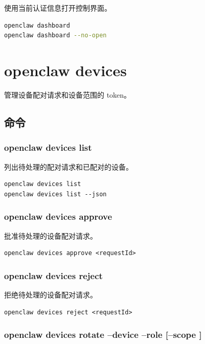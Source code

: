 使用当前认证信息打开控制界面。

\begin{lstlisting}[language=bash]
openclaw dashboard
openclaw dashboard --no-open
\end{lstlisting}



\clearpage

\section{openclaw devices}


管理设备配对请求和设备范围的 token。

\subsection{命令}


\subsubsection{openclaw devices list}


列出待处理的配对请求和已配对的设备。

\begin{lstlisting}
openclaw devices list
openclaw devices list --json
\end{lstlisting}


\subsubsection{openclaw devices approve }


批准待处理的设备配对请求。

\begin{lstlisting}
openclaw devices approve <requestId>
\end{lstlisting}


\subsubsection{openclaw devices reject }


拒绝待处理的设备配对请求。

\begin{lstlisting}
openclaw devices reject <requestId>
\end{lstlisting}


\subsubsection{openclaw devices rotate --device  --role  [--scope ]}


